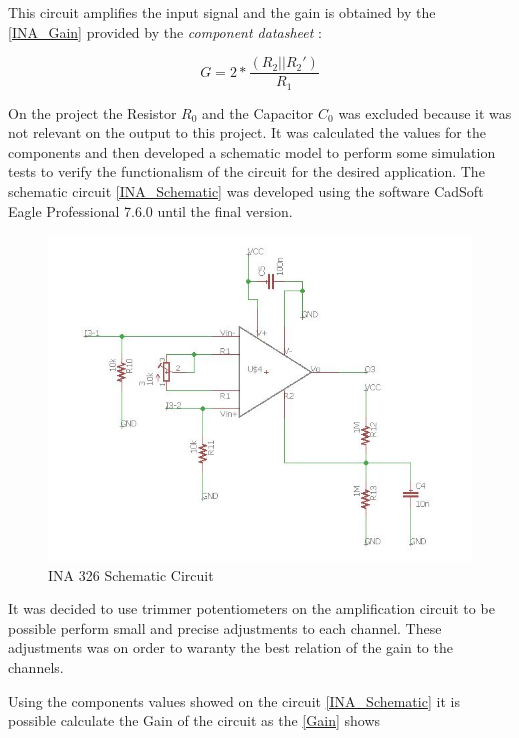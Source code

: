 This circuit amplifies the input signal and the gain is obtained by the \autoref{INA_Gain} provided by the \textit{component datasheet}
\cite{INA326}:

\begin{equation}
\label{INA_Gain}
G=2*\frac{(R_2||R_2 ')}{R_1}
\end{equation}

On the project the Resistor $R_0$ and the Capacitor $C_0$ was excluded because
it was not relevant on the output to this project. It was calculated the values
for the components and then developed a schematic model to perform some simulation tests
to verify the functionalism of the circuit for the desired application.
The schematic circuit \autoref{INA_Schematic} was developed using the software CadSoft Eagle Professional 7.6.0
until the final version.

\begin{figure}[!htpb]
\centering
\caption{INA 326 Schematic Circuit}
\label{INA_Schematic}
\includegraphics[scale=0.65]{images/INA_Schematic}
\end{figure}

It was decided to use trimmer potentiometers on the amplification circuit to be possible perform small and precise adjustments to each
channel. These adjustments was on order to waranty the best relation of the gain to the channels.

Using the components values showed on the circuit \autoref{INA_Schematic} it is possible calculate
the Gain of the circuit as the \autoref{Gain} shows

